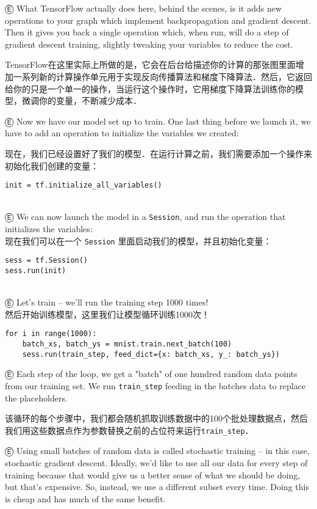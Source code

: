 Ⓔ What TensorFlow actually does here, behind the scenes, is it adds new operations to your graph which implement backpropagation and gradient descent. Then it gives you back a single operation which, when run, will do a step of gradient descent training, slightly tweaking your variables to reduce the cost.

TensorFlow在这里实际上所做的是，它会在后台给描述你的计算的那张图里面增加一系列新的计算操作单元用于实现反向传播算法和梯度下降算法．然后，它返回给你的只是一个单一的操作，当运行这个操作时，它用梯度下降算法训练你的模型，微调你的变量，不断减少成本．

Ⓔ Now we have our model set up to train. One last thing before we launch it, we have to add an operation to initialize the variables we created:

现在，我们已经设置好了我们的模型．在运行计算之前，我们需要添加一个操作来初始化我们创建的变量：

\begin{lstlisting}
init = tf.initialize_all_variables()
\end{lstlisting}
\\
Ⓔ We can now launch the model in a \lstinline{Session}, and run the operation that initializes the variables:\\
现在我们可以在一个 \lstinline{Session} 里面启动我们的模型，并且初始化变量：
\begin{lstlisting}
sess = tf.Session()
sess.run(init)
\end{lstlisting}
\\
Ⓔ Let's train -- we'll run the training step 1000 times!\\
然后开始训练模型，这里我们让模型循环训练1000次！
\begin{lstlisting}
for i in range(1000):
    batch_xs, batch_ys = mnist.train.next_batch(100)
    sess.run(train_step, feed_dict={x: batch_xs, y_: batch_ys})
\end{lstlisting}

Ⓔ Each step of the loop, we get a "batch" of one hundred random data points from our training set. We run \lstinline{train_step} feeding in the batches data to replace the placeholders.

该循环的每个步骤中，我们都会随机抓取训练数据中的100个批处理数据点，然后我们用这些数据点作为参数替换之前的占位符来运行\lstinline{train_step}．

Ⓔ Using small batches of random data is called stochastic training -- in this case, stochastic gradient descent. Ideally, we'd like to use all our data for every step of training because that would give us a better sense of what we should be doing, but that's expensive. So, instead, we use a different subset every time. Doing this is cheap and has much of the same benefit.

